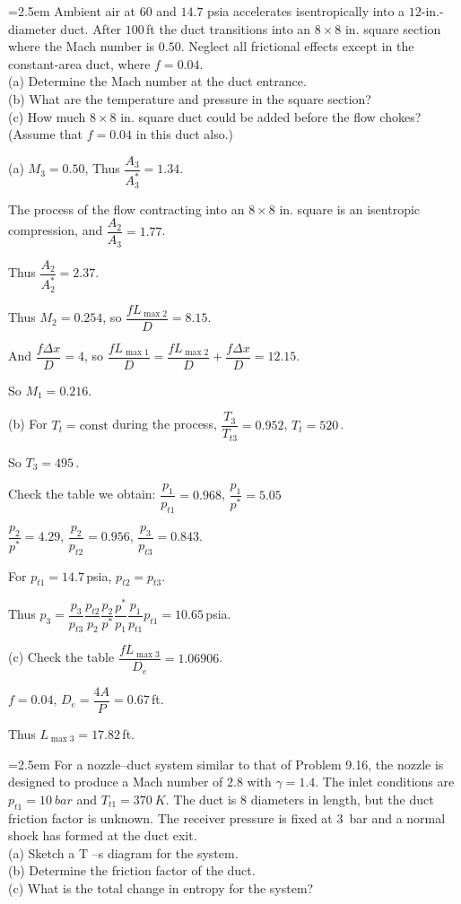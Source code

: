 \documentclass[12pt]{article}
\newlength{\questionlabelwidth}
\newcommand{\question}[2]{%
  \par\noindent
  {\hangindent=2.5em %
   \hangafter=1 %
   \makebox[\questionlabelwidth][l]{\textbf{#1}}#2\par}%
}
\begin{document}
\question{9.13}{Ambient air at \SI{60}{\Fahrenheit} and $14.7$ psia accelerates isentropically into a $12$-in.-diameter duct. After $100$\,\si{ft} the duct transitions into an $8 \times 8$ in. square section where the Mach number is $0.50$. Neglect all frictional effects except in the constant-area duct, where $f = 0.04$.\\
(a) Determine the Mach number at the duct entrance.\\
(b) What are the temperature and pressure in the square section?\\
(c) How much $8 \times 8$ in. square duct could be added before the flow chokes? (Assume that $f = 0.04$ in this duct also.)
}

\begin{answerbox}
(a) $M_3=0.50$, Thus $\dfrac{A_3}{A^{*}_3}=1.34$.

The process of the flow contracting into an $8\times 8$ in. square is an isentropic compression, and $\dfrac{A_2}{A_3}=1.77$.

Thus $\dfrac{A_2}{A_2^{*}}=2.37$.

Thus $M_2=0.254$, so $\dfrac{fL_{\max 2}}{D}=8.15$.

And $\dfrac{f\Delta x}{D}=4$, so $\dfrac{fL_{\max 1}}{D}=\dfrac{fL_{\max 2}}{D}+\dfrac{f\Delta x}{D}=12.15$.

So $M_1=0.216$.

(b) For $T_t=\text{const}$ during the process, $\dfrac{T_3}{T_{t3}}=0.952$, $T_t=520$\,\si{\Rankine}.

So $T_3=495$\,\si{\Rankine}.

Check the table we obtain: $\dfrac{p_1}{p_{t1}}=0.968$, $\dfrac{p_1}{p^{*}}=5.05$

$\dfrac{p_2}{p^{*}}=4.29$, $\dfrac{p_2}{p_{t2}}=0.956$, $\dfrac{p_3}{p_{t3}}=0.843$.

For $p_{t1}=14.7$\,\si{psia}, $p_{t2}=p_{t3}$.

Thus $p_3=\dfrac{p_3}{p_{t3}}\dfrac{p_{t2}}{p_2}\dfrac{p_2}{p^{*}}\dfrac{p^{*}}{p_1}\dfrac{p_1}{p_{t1}}p_{t1}=10.65$\,\si{psia}.

(c) Check the table $\dfrac{fL_{\max 3}}{D_e}=1.06906$.

$f=0.04$, $D_e=\dfrac{4A}{P}=0.67$\,\si{ft}.

Thus $L_{\max 3}=17.82$\,\si{ft}.
\end{answerbox}

\question{9.17}{For a nozzle–duct system similar to that of Problem 9.16, the nozzle is designed to produce a Mach number of $2.8$ with $\gamma = 1.4$. The inlet conditions are $p_{t1} = \SI{10}{bar}$ and $T_{t1} = \SI{370}{K}$. The duct is $8$ diameters in length, but the duct friction factor is unknown. The receiver pressure is fixed at \SI{3}{bar} and a normal shock has formed at the duct exit.\\
(a) Sketch a T –s diagram for the system.\\
(b)  Determine the friction factor of the duct.\\
(c) What is the total change in entropy for the system?
}
\end{document}
